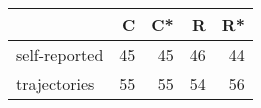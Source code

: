 \begin{longtable}{l|rrrr}
\toprule
\multicolumn{1}{l}{} & C & C* & R & R* \\ 
\midrule
self-reported & 45 & 45 & 46 & 44 \\ 
trajectories & 55 & 55 & 54 & 56 \\ 
\bottomrule
\end{longtable}

